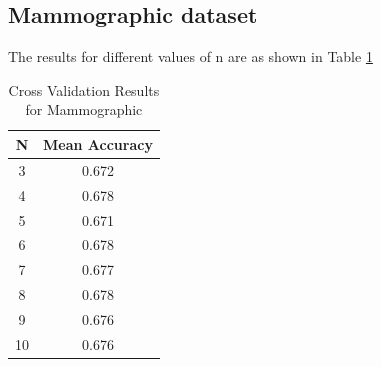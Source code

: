 \documentclass[11pt, pdftex]{article}
\begin{document}
\subsection{Mammographic dataset}
The results for different values of n are as shown in Table \ref{tab:man}
\begin{table}
\centering
\begin{tabular}{ | c | c |}
    \hline
    {\bf N} & {\bf Mean Accuracy} \\ 
    \hline
    3 & 0.672\\
	\hline
	4 & 0.678\\
	\hline
	5 & 0.671\\
	\hline
	6 & 0.678\\
	\hline
	7 & 0.677\\
	\hline
	8 & 0.678\\
	\hline
	9 & 0.676\\
	\hline
	10 & 0.676\\
	\hline
	\end{tabular}
	\caption{Cross Validation Results for Mammographic}
    \label{tab:man}
\end{table}
\end{document}
